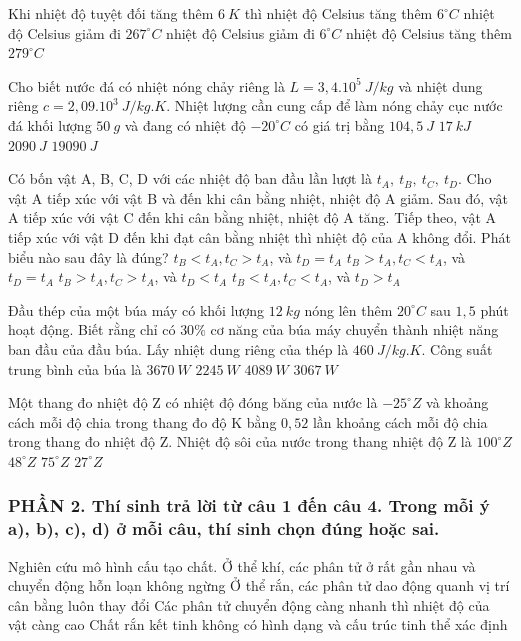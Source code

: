 \begin{ex}
Khi nhiệt độ tuyệt đối tăng thêm $6\ K$ thì
\choice
{nhiệt độ Celsius tăng thêm $6^\circ C$}
{nhiệt độ Celsius giảm đi $267^\circ C$}
{\True nhiệt độ Celsius giảm đi $6^\circ C$}
{nhiệt độ Celsius tăng thêm $279^\circ C$}
\loigiai{}
\end{ex}

\begin{ex}
Cho biết nước đá có nhiệt nóng chảy riêng là $L=3,4.10^5\ J/kg$ và nhiệt dung riêng $c=2,09.10^3\ J/kg.K$. Nhiệt lượng cần cung cấp để làm nóng chảy cục nước đá khối lượng $50\ g$ và đang có nhiệt độ $-20^{\circ} C$ có giá trị bằng
\choice
{$104,5\ J$}
{$17\ kJ$}
{$2090\ J$}
{\True $19090\ J$}
\loigiai{}
\end{ex}

\begin{ex}
Có bốn vật A, B, C, D với các nhiệt độ ban đầu lần lượt là $t_A,\ t_B,\ t_C,\ t_D$. Cho vật A tiếp xúc với vật B và đến khi cân bằng nhiệt, nhiệt độ A giảm. Sau đó, vật A tiếp xúc với vật C đến khi cân bằng nhiệt, nhiệt độ A tăng. Tiếp theo, vật A tiếp xúc với vật D đến khi đạt cân bằng nhiệt thì nhiệt độ của A không đổi. Phát biểu nào sau đây là đúng?
\choice
{\True $t_B<t_A, t_C>t_A$, và $t_D=t_A$}
{$t_B>t_A, t_C<t_A$, và $t_D=t_A$}
{$t_B>t_A, t_C>t_A$, và $t_D<t_A$}
{$t_B<t_A, t_C<t_A$, và $t_D>t_A$}
\loigiai{}
\end{ex}

\begin{ex}
Đầu thép của một búa máy có khối lượng $12\ kg$ nóng lên thêm $20^\circ C$ sau $1,5$ phút hoạt động. Biết rằng chỉ có $30\%$ cơ năng của búa máy chuyển thành nhiệt năng ban đầu của đầu búa. Lấy nhiệt dung riêng của thép là $460\ J/kg.K$. Công suất trung bình của búa là
\choice
{$3670\ W$}
{$2245\ W$}
{\True $4089\ W$}
{$3067\ W$}
\loigiai{}
\end{ex}

\begin{ex}
Một thang đo nhiệt độ Z có nhiệt độ đóng băng của nước là $-25^\circ Z$ và khoảng cách mỗi độ chia trong thang đo độ K bằng $0,52$ lần khoảng cách mỗi độ chia trong thang đo nhiệt độ Z. Nhiệt độ sôi của nước trong thang nhiệt độ Z là
\choice
{$100^\circ Z$}
{$48^\circ Z$}
{$75^\circ Z$}
{\True $27^\circ Z$}
\loigiai{}
\end{ex}

\subsubsection*{PHẦN 2. Thí sinh trả lời từ câu 1 đến câu 4. Trong mỗi ý a), b), c), d) ở mỗi câu, thí sinh chọn đúng hoặc sai.}
\setcounter{ex}{0}
\begin{ex}%
Nghiên cứu mô hình cấu tạo chất.
\choiceTFt
{Ở thể khí, các phân tử ở rất gần nhau và chuyển động hỗn loạn không ngừng}
{Ở thể rắn, các phân tử dao động quanh vị trí cân bằng luôn thay đổi}
{\True Các phân tử chuyển động càng nhanh thì nhiệt độ của vật càng cao}
{Chất rắn kết tinh không có hình dạng và cấu trúc tinh thể xác định}
\loigiai{}
\end{ex}

